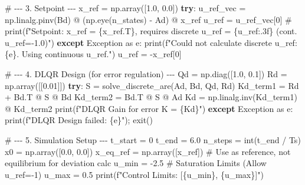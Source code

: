 \documentclass[
  letterpaper,
  DIV=11,
  numbers=noendperiod,
  oneside]{scrartcl}
\newenvironment{Shaded}{\begin{snugshade}}{\end{snugshade}}
\newcommand{\BuiltInTok}[1]{\textcolor[rgb]{0.00,0.23,0.31}{#1}}
\newcommand{\CommentTok}[1]{\textcolor[rgb]{0.37,0.37,0.37}{#1}}
\newcommand{\ControlFlowTok}[1]{\textcolor[rgb]{0.00,0.23,0.31}{\textbf{#1}}}
\newcommand{\DecValTok}[1]{\textcolor[rgb]{0.68,0.00,0.00}{#1}}
\newcommand{\FloatTok}[1]{\textcolor[rgb]{0.68,0.00,0.00}{#1}}
\newcommand{\ImportTok}[1]{\textcolor[rgb]{0.00,0.46,0.62}{#1}}
\newcommand{\NormalTok}[1]{\textcolor[rgb]{0.00,0.23,0.31}{#1}}
\newcommand{\OperatorTok}[1]{\textcolor[rgb]{0.37,0.37,0.37}{#1}}
\newcommand{\PreprocessorTok}[1]{\textcolor[rgb]{0.68,0.00,0.00}{#1}}
\newcommand{\SpecialCharTok}[1]{\textcolor[rgb]{0.37,0.37,0.37}{#1}}
\newcommand{\SpecialStringTok}[1]{\textcolor[rgb]{0.13,0.47,0.30}{#1}}
\begin{document}
\begin{Shaded}
\begin{Highlighting}[numbers=left,,]
\CommentTok{\# {-}{-}{-} 3. Setpoint {-}{-}{-}}
\NormalTok{x\_ref }\OperatorTok{=}\NormalTok{ np.array([}\FloatTok{1.0}\NormalTok{, }\FloatTok{0.0}\NormalTok{])}
\ControlFlowTok{try}\NormalTok{:}
\NormalTok{    u\_ref\_vec }\OperatorTok{=}\NormalTok{ np.linalg.pinv(Bd) }\OperatorTok{@}\NormalTok{ (np.eye(n\_states) }\OperatorTok{{-}}\NormalTok{ Ad) }\OperatorTok{@}\NormalTok{ x\_ref}
\NormalTok{    u\_ref }\OperatorTok{=}\NormalTok{ u\_ref\_vec[}\DecValTok{0}\NormalTok{]}
    \CommentTok{\# print(f"Setpoint: x\_ref = \{x\_ref.T\}, requires discrete u\_ref = \{u\_ref:.3f\} (cont. u\_ref={-}1.0)")}
\ControlFlowTok{except} \PreprocessorTok{Exception} \ImportTok{as}\NormalTok{ e:}
    \BuiltInTok{print}\NormalTok{(}\SpecialStringTok{f"Could not calculate discrete u\_ref: }\SpecialCharTok{\{}\NormalTok{e}\SpecialCharTok{\}}\SpecialStringTok{. Using continuous u\_ref."}\NormalTok{)}
\NormalTok{    u\_ref }\OperatorTok{=} \OperatorTok{{-}}\NormalTok{x\_ref[}\DecValTok{0}\NormalTok{]}

\CommentTok{\# {-}{-}{-} 4. DLQR Design (for error regulation) {-}{-}{-}}
\NormalTok{Qd }\OperatorTok{=}\NormalTok{ np.diag([}\FloatTok{1.0}\NormalTok{, }\FloatTok{0.1}\NormalTok{])}
\NormalTok{Rd }\OperatorTok{=}\NormalTok{ np.array([[}\FloatTok{0.01}\NormalTok{]])}
\ControlFlowTok{try}\NormalTok{:}
\NormalTok{    S }\OperatorTok{=}\NormalTok{ solve\_discrete\_are(Ad, Bd, Qd, Rd)}
\NormalTok{    Kd\_term1 }\OperatorTok{=}\NormalTok{ Rd }\OperatorTok{+}\NormalTok{ Bd.T }\OperatorTok{@}\NormalTok{ S }\OperatorTok{@}\NormalTok{ Bd}
\NormalTok{    Kd\_term2 }\OperatorTok{=}\NormalTok{ Bd.T }\OperatorTok{@}\NormalTok{ S }\OperatorTok{@}\NormalTok{ Ad}
\NormalTok{    Kd }\OperatorTok{=}\NormalTok{ np.linalg.inv(Kd\_term1) }\OperatorTok{@}\NormalTok{ Kd\_term2}
    \BuiltInTok{print}\NormalTok{(}\SpecialStringTok{f"DLQR Gain for error K = }\SpecialCharTok{\{}\NormalTok{Kd}\SpecialCharTok{\}}\SpecialStringTok{"}\NormalTok{)}
\ControlFlowTok{except} \PreprocessorTok{Exception} \ImportTok{as}\NormalTok{ e:}
    \BuiltInTok{print}\NormalTok{(}\SpecialStringTok{f"DLQR Design failed: }\SpecialCharTok{\{}\NormalTok{e}\SpecialCharTok{\}}\SpecialStringTok{"}\NormalTok{)}\OperatorTok{;}\NormalTok{ exit()}

\CommentTok{\# {-}{-}{-} 5. Simulation Setup {-}{-}{-}}
\NormalTok{t\_start }\OperatorTok{=} \DecValTok{0}
\NormalTok{t\_end }\OperatorTok{=} \FloatTok{6.0}
\NormalTok{n\_steps }\OperatorTok{=} \BuiltInTok{int}\NormalTok{(t\_end }\OperatorTok{/}\NormalTok{ Ts)}
\NormalTok{x0 }\OperatorTok{=}\NormalTok{ np.array([}\FloatTok{0.0}\NormalTok{, }\FloatTok{0.0}\NormalTok{])}
\NormalTok{x\_eq\_ref }\OperatorTok{=}\NormalTok{ np.array([x\_ref]) }\CommentTok{\# Use as reference, not equilibrium for deviation calc}
\NormalTok{u\_min }\OperatorTok{=} \OperatorTok{{-}}\FloatTok{2.5} \CommentTok{\# Saturation Limits (Allow u\_ref={-}1)}
\NormalTok{u\_max }\OperatorTok{=} \FloatTok{0.5}
\BuiltInTok{print}\NormalTok{(}\SpecialStringTok{f"Control Limits: [}\SpecialCharTok{\{}\NormalTok{u\_min}\SpecialCharTok{\}}\SpecialStringTok{, }\SpecialCharTok{\{}\NormalTok{u\_max}\SpecialCharTok{\}}\SpecialStringTok{]"}\NormalTok{)}


\end{Highlighting}
\end{Shaded}
\end{document}
